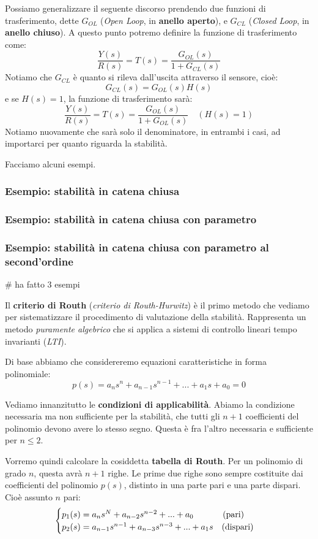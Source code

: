 \documentclass[a4paper,11pt]{article}
\begin{document}
Possiamo generalizzare il seguente discorso prendendo due funzioni di trasferimento, dette $G_{OL}$ (\textit{Open Loop}, in \textbf{anello aperto}), e $G_{CL}$ (\textit{Closed Loop}, in \textbf{anello chiuso}).
A questo punto potremo definire la funzione di trasferimento come:
$$
\frac{Y(s)}{R(s)} = T(s) = \frac{G_{OL}(s)}{1 + G_{CL}(s)}
$$
Notiamo che $G_{CL}$ è quanto si rileva dall'uscita attraverso il sensore, cioè:
$$
G_{CL}(s) = G_{OL}(s) H(s)
$$
e se $H(s) = 1$, la funzione di trasferimento sarà:
$$
\frac{Y(s)}{R(s)} = T(s) = \frac{G_{OL}(s)}{1 + G_{OL}(s)} \quad (H(s) = 1)
$$
Notiamo nuovamente che sarà solo il denominatore, in entrambi i casi, ad importarci per quanto riguarda la stabilità.

Facciamo alcuni esempi.

\subsubsection{Esempio: stabilità in catena chiusa}
\subsubsection{Esempio: stabilità in catena chiusa con parametro}
\subsubsection{Esempio: stabilità in catena chiusa con parametro al second'ordine}

# ha fatto 3 esempi

\par\bigskip

Il \textbf{criterio di Routh} (\textit{criterio di Routh-Hurwitz}) è il primo metodo che vediamo per sistematizzare il procedimento di valutazione della stabilità.
Rappresenta un metodo \textit{puramente algebrico} che si applica a sistemi di controllo lineari tempo invarianti (\textit{LTI}).

Di base abbiamo che considereremo equazioni caratteristiche in forma polinomiale:
$$
p(s) = a_n s^n + a_{n - 1}s^{n - 1} + ... + a_1 s + a_0 = 0
$$

Vediamo innanzitutto le \textbf{condizioni di applicabilità}.
Abiamo la condizione necessaria ma non sufficiente per la stabilità, che tutti gli $n + 1$ coefficienti del polinomio devono avere lo stesso segno.
Questa è fra l'altro necessaria e sufficiente per $n \leq 2$.

Vorremo quindi calcolare la cosiddetta \textbf{tabella di Routh}.
Per un polinomio di grado $n$, questa avrà $n + 1$ righe.
Le prime due righe sono sempre costituite dai coefficienti del polinomio $p(s)$, distinto in una parte pari e una parte dispari.
Cioè assunto $n$ pari:
\[
	\begin{cases}
		p_1(s) = a_n s^N + a_{n - 2} s^{n - 2} + ... + a_0 \quad \hspace{0.85cm} \text{(pari)} \\
		p_2(s) = a_{n - 1} s^{n - 1} + a_{n - 3} s^{n - 3} + ... + a_1 s \quad \text{(dispari)}
	\end{cases}
\]
\end{document}
